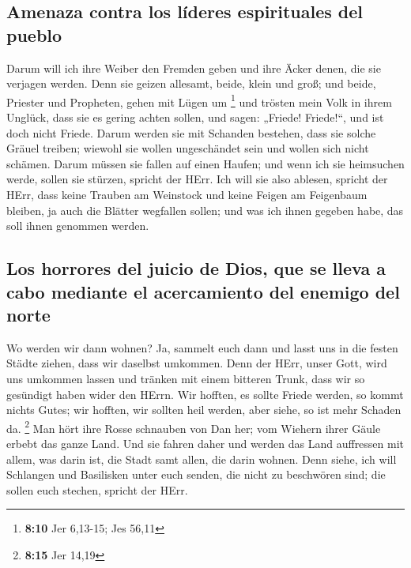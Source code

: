 \hypertarget{amenaza-contra-los-luxedderes-espirituales-del-pueblo}{%
\subsection{Amenaza contra los líderes espirituales del
pueblo}\label{amenaza-contra-los-luxedderes-espirituales-del-pueblo}}

 Darum will ich ihre Weiber den Fremden geben und ihre
Äcker denen, die sie verjagen werden. Denn sie geizen allesamt, beide,
klein und groß; und beide, Priester und Propheten, gehen mit Lügen um
\footnote{\textbf{8:10} Jer 6,13-15; Jes 56,11}  und
trösten mein Volk in ihrem Unglück, dass sie es gering achten sollen,
und sagen: „Friede! Friede!{}``, und ist doch nicht Friede.
 Darum werden sie mit Schanden bestehen, dass sie solche
Gräuel treiben; wiewohl sie wollen ungeschändet sein und wollen sich
nicht schämen. Darum müssen sie fallen auf einen Haufen; und wenn ich
sie heimsuchen werde, sollen sie stürzen, spricht der HErr.
 Ich will sie also ablesen, spricht der HErr, dass keine
Trauben am Weinstock und keine Feigen am Feigenbaum bleiben, ja auch die
Blätter wegfallen sollen; und was ich ihnen gegeben habe, das soll ihnen
genommen werden.

\hypertarget{los-horrores-del-juicio-de-dios-que-se-lleva-a-cabo-mediante-el-acercamiento-del-enemigo-del-norte}{%
\subsection{Los horrores del juicio de Dios, que se lleva a cabo
mediante el acercamiento del enemigo del
norte}\label{los-horrores-del-juicio-de-dios-que-se-lleva-a-cabo-mediante-el-acercamiento-del-enemigo-del-norte}}

 Wo werden wir dann wohnen? Ja, sammelt euch dann und
lasst uns in die festen Städte ziehen, dass wir daselbst umkommen. Denn
der HErr, unser Gott, wird uns umkommen lassen und tränken mit einem
bitteren Trunk, dass wir so gesündigt haben wider den HErrn.
 Wir hofften, es sollte Friede werden, so kommt nichts
Gutes; wir hofften, wir sollten heil werden, aber siehe, so ist mehr
Schaden da. \footnote{\textbf{8:15} Jer 14,19}  Man hört
ihre Rosse schnauben von Dan her; vom Wiehern ihrer Gäule erbebt das
ganze Land. Und sie fahren daher und werden das Land auffressen mit
allem, was darin ist, die Stadt samt allen, die darin wohnen.
 Denn siehe, ich will Schlangen und Basilisken unter euch
senden, die nicht zu beschwören sind; die sollen euch stechen, spricht
der HErr.

